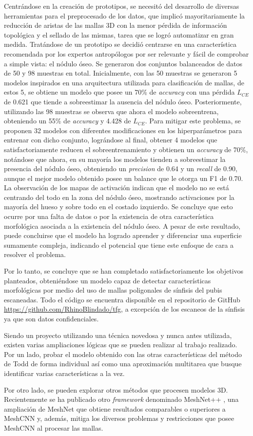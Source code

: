 Centrándose en la creación de prototipos, se necesitó del desarrollo de diversas herramientas para el preprocesado de los datos, que implicó mayoritariamente la reducción de aristas de las mallas 3D con la menor pérdida de información topológica y el sellado de las mismas, tarea que se logró automatizar en gran medida. Tratándose de un prototipo se decidió centrarse en una característica recomendada por los expertos antropólogos por ser relevante y fácil de comprobar a simple vista: el nódulo óseo. Se generaron dos conjuntos balanceados de datos de 50 y 98 muestras en total. Inicialmente, con las 50 muestras se generaron 5 modelos inspirados en una arquitectura utilizada para clasificación de mallas, de estos 5, se obtiene un modelo que posee un 70\% de \textit{accuracy} con una pérdida $L_{CE}$ de 0.621 que tiende a sobreestimar la ausencia del nódulo óseo. Posteriormente, utilizando las 98 muestras se observa que ahora el modelo sobreentrena, obteniendo un 55\% de \textit{accuracy} y 4.428 de $L_{CE}$. Para mitigar este problema, se proponen 32 modelos con diferentes modificaciones en los hiperparámetros para entrenar con dicho conjunto, lográndose al final, obtener 4 modelos que satisfactoriamente reducen el sobreentrenamiento y obtienen un \textit{accuracy} de 70\%, notándose que ahora, en su mayoría los modelos tienden a sobreestimar la presencia del nódulo óseo, obteniendo un \textit{precision} de 0.64 y un \textit{recall} de 0.90, aunque el mejor modelo obtenido posee un balance que le otorga un F1 de 0.70. La observación de los mapas de activación indican que el modelo no se está centrando del todo en la zona del nódulo óseo, mostrando activaciones por la mayoría del hueso y sobre todo en el costado izquierdo. Se concluye que esto ocurre por una falta de datos o por la existencia de otra característica morfológica asociada a la existencia del nódulo óseo. A pesar de este resultado, puede concluirse que el modelo ha logrado aprender y diferenciar una superficie sumamente compleja, indicando el potencial que tiene este enfoque de cara a resolver el problema.

Por lo tanto, se concluye que se han completado satisfactoriamente los objetivos planteados, obteniéndose un modelo capaz de detectar características morfológicas por medio del uso de mallas poligonales de sínfisis del pubis escaneadas. Todo el código se encuentra disponible en el repositorio de GitHub \url{https://github.com/RhinoBlindado/tfg}, a excepción de los escaneos de la sínfisis ya que son datos confidenciales.

Siendo un proyecto utilizando una técnica novedosa y nunca antes utilizada, existen varias ampliaciones lógicas que se pueden realizar al trabajo realizado. Por un lado, probar el modelo obtenido con las otras características del método de Todd de forma individual así como una aproximación multitarea que busque identificar varias características a la vez.

Por otro lado, se pueden explorar otros métodos que procesen modelos 3D. Recientemente se ha publicado otro \textit{framework} denominado MeshNet++ \cite{singh2021meshnet++}, una ampliación de MeshNet \cite{feng2019meshnet} que obtiene resultados comparables o superiores a MeshCNN y, además, mitiga los diversos problemas y restricciones que posee MeshCNN al procesar las mallas.